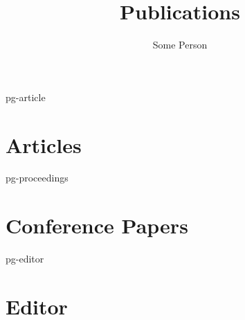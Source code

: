 \documentclass[a4paper]{article}
\title{Publications}
\author{Some Person}
\begin{document}
\maketitle



\begin{btSect}{pg-article}
  \section{Articles}
  \btPrintAll
\end{btSect}

\begin{btSect}{pg-proceedings}
  \section{Conference Papers}
  \btPrintAll
\end{btSect}

\begin{btSect}{pg-editor}
  \section{Editor}
  \btPrintAll
\end{btSect}
\end{document}
